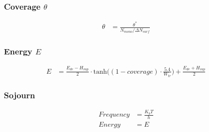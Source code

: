 \subsubsection*{Coverage $\theta$}
\begin{equation}
	\label{eq:cov}
	\begin{split}
		\theta&=\frac{\theta^*}{N_{mono}/\Delta N_{surf}}
	\end{split}
\end{equation}


\subsubsection*{Energy $E$}
\begin{equation}
	\label{eq:energy}
	\begin{split}
		E&=\frac{E_{de}-H_{vap}}{2} \cdot \text{tanh}\Big((1-coverage) \cdot \frac{5.4}{W_{tr}}\Big) + \frac{E_{de}+H_{vap}}{2}
	\end{split}
\end{equation}

\subsubsection*{Sojourn}
\begin{equation}
	\label{eq:cov}
	\begin{split}
		Frequency&=\frac{K_b T}{h}\\
		Energy&= E
	\end{split}
\end{equation}

